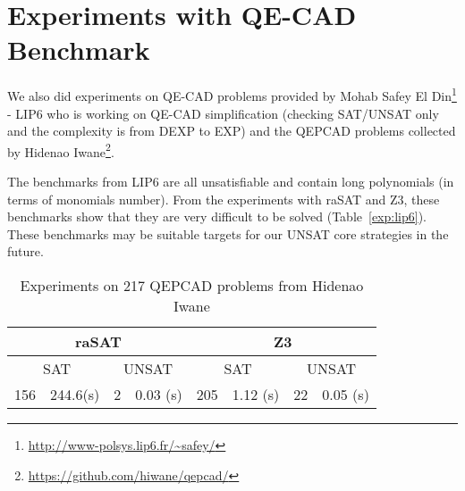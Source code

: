 \begin{table*}[t]
\centering
{}
\medskip 
\caption{Comparison among SMT solvers} \label{tab:comparison}
\end{table*}


\section{Experiments with QE-CAD Benchmark}
We also did experiments on QE-CAD problems provided by Mohab Safey El Din\footnote{\url{http://www-polsys.lip6.fr/~safey/}} - LIP6 who is working on QE-CAD simplification (checking SAT/UNSAT only and the complexity is from DEXP to EXP) and the QEPCAD problems collected by Hidenao Iwane\footnote{\url{https://github.com/hiwane/qepcad/}}. 

The benchmarks from LIP6 are all unsatisfiable and contain long polynomials (in terms of monomials number). From the experiments with raSAT and Z3, these benchmarks show that they are very difficult to be solved (Table~\ref{exp:lip6}). These benchmarks may be suitable targets for our UNSAT core strategies in the future. 

\begin{table} \label{exp:hiwane}
\begin{center}
\begin{tabular}{|c|c|c|c|c|c|c|c|}
\hline
\multicolumn{4}{|c|}{raSAT} & \multicolumn{4}{c|}{Z3}\\ \hline
\multicolumn{2}{|c|}{SAT}  & \multicolumn{2}{c|}{UNSAT} & \multicolumn{2}{c|}{SAT} & \multicolumn{2}{c|}{UNSAT} \\ \hline
156 & 244.6(s) & 2 & 0.03 (s) & 205 & 1.12 (s) & 22 & 0.05 (s) \\ \hline
\end{tabular}
\end{center}
\caption{Experiments on 217 QEPCAD problems from Hidenao Iwane}
\end{table}

